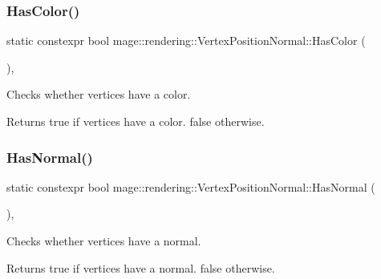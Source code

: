 \subsubsection{\texorpdfstring{Has\+Color()}{HasColor()}}
{\footnotesize\ttfamily static constexpr bool mage\+::rendering\+::\+Vertex\+Position\+Normal\+::\+Has\+Color (\begin{DoxyParamCaption}{ }\end{DoxyParamCaption})\hspace{0.3cm}{\ttfamily [static]}, {\ttfamily [noexcept]}}

Checks whether vertices have a color.

\begin{DoxyReturn}{Returns}
{\ttfamily true} if vertices have a color. {\ttfamily false} otherwise. 
\end{DoxyReturn}
\mbox{\label{structmage_1_1rendering_1_1_vertex_position_normal_af5a32a3e51ce13c36b665f83f40209b6}} 
\subsubsection{\texorpdfstring{Has\+Normal()}{HasNormal()}}
{\footnotesize\ttfamily static constexpr bool mage\+::rendering\+::\+Vertex\+Position\+Normal\+::\+Has\+Normal (\begin{DoxyParamCaption}{ }\end{DoxyParamCaption})\hspace{0.3cm}{\ttfamily [static]}, {\ttfamily [noexcept]}}

Checks whether vertices have a normal.

\begin{DoxyReturn}{Returns}
{\ttfamily true} if vertices have a normal. {\ttfamily false} otherwise. 
\end{DoxyReturn}
\mbox{\label{structmage_1_1rendering_1_1_vertex_position_normal_a90efd74233b76b071a322d737caf3abf}} 
